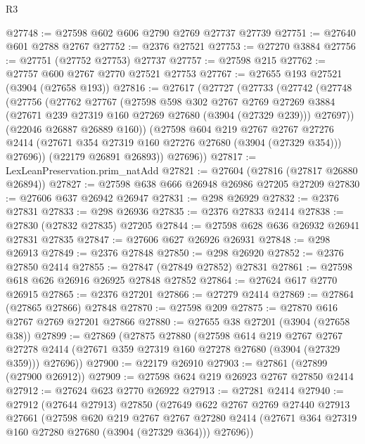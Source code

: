 \begin{lexlean}{R3}
\begin{coremodule}
@27748 := @27598 @602 @606 @2790 @2769 @27737 @27739
@27751 := @27640 @601 @2788 @2767
@27752 := @2376 @27521
@27753 := @27270 @3884
@27756 := @27751 (@27752 @27753) @27737
@27757 := @27598 @215
@27762 := @27757 @600 @2767 @2770 @27521 @27753
@27767 := @27655 @193 @27521 (@3904 (@27658 @193))
@27816 := @27617
    (@27727
      (@27733
        (@27742
          (@27748
            (@27756
              (@27762
                @27767
                (@27598
                  @598
                  @302
                  @2767
                  @2769
                  @27269
                  @3884
                  (@27671 @239 @27319 @160 @27269 @27680 (@3904 (@27329 @239)))
                  @27697))
              (@22046 @26887 @26889 @160))
            (@27598
              @604
              @219
              @2767
              @2767
              @27276
              @2414
              (@27671 @354 @27319 @160 @27276 @27680 (@3904 (@27329 @354)))
              @27696))
          (@22179 @26891 @26893))
        @27696))
@27817 := LexLeanPreservation.prim_natAdd
@27821 := @27604 (@27816 (@27817 @26880 @26894))
@27827 := @27598 @638 @666 @26948 @26986 @27205 @27209
@27830 := @27606 @637 @26942 @26947
@27831 := @298 @26929
@27832 := @2376 @27831
@27833 := @298 @26936
@27835 := @2376 @27833 @2414
@27838 := @27830 (@27832 @27835) @27205
@27844 := @27598 @628 @636 @26932 @26941 @27831 @27835
@27847 := @27606 @627 @26926 @26931
@27848 := @298 @26913
@27849 := @2376 @27848
@27850 := @298 @26920
@27852 := @2376 @27850 @2414
@27855 := @27847 (@27849 @27852) @27831
@27861 := @27598 @618 @626 @26916 @26925 @27848 @27852
@27864 := @27624 @617 @2770 @26915
@27865 := @2376 @27201
@27866 := @27279 @2414
@27869 := @27864 (@27865 @27866) @27848
@27870 := @27598 @209
@27875 := @27870 @616 @2767 @2769 @27201 @27866
@27880 := @27655 @38 @27201 (@3904 (@27658 @38))
@27899 := @27869
    (@27875
      @27880
      (@27598
        @614
        @219
        @2767
        @2767
        @27278
        @2414
        (@27671 @359 @27319 @160 @27278 @27680 (@3904 (@27329 @359)))
        @27696))
@27900 := @22179 @26910
@27903 := @27861 (@27899 (@27900 @26912))
@27909 := @27598 @624 @219 @26923 @2767 @27850 @2414
@27912 := @27624 @623 @2770 @26922
@27913 := @27281 @2414
@27940 := @27912
    (@27644 @27913)
    @27850
    (@27649
      @622
      @2767
      @2769
      @27440
      @27913
      @27661
      (@27598
        @620
        @219
        @2767
        @2767
        @27280
        @2414
        (@27671 @364 @27319 @160 @27280 @27680 (@3904 (@27329 @364)))
        @27696))

\end{coremodule}
\end{lexlean}
